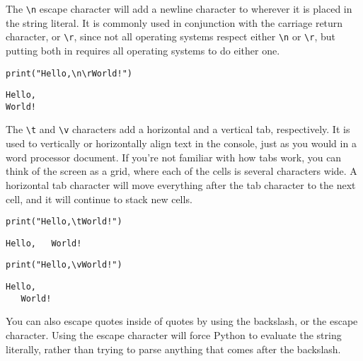 \par
{}
The \verb|\n| escape character will add a newline character to wherever it is placed in the string literal. It is commonly used in conjunction with the carriage return character, or \verb|\r|, since not all operating systems respect either \verb|\n| or \verb|\r|, but putting both in requires all operating systems to do either one.\par
\begin{lstlisting}[style=pippython]
print("Hello,\n\rWorld!")
\end{lstlisting}
\begin{lstlisting}
Hello,
World!
\end{lstlisting}
The \verb|\t| and \verb|\v| characters add a horizontal and a vertical tab, respectively. It is used to vertically or horizontally align text in the console, just as you would in a word processor document. If you're not familiar with how tabs work, you can think of the screen as a grid, where each of the cells is several characters wide. A horizontal tab character will move everything after the tab character to the next cell, and it will continue to stack new cells.\par
\begin{lstlisting}[style=pippython]
print("Hello,\tWorld!")
\end{lstlisting}
\begin{lstlisting}
Hello,   World!
\end{lstlisting}
\begin{lstlisting}[style=pippython]
print("Hello,\vWorld!")
\end{lstlisting}
\begin{lstlisting}
Hello,
   World!
\end{lstlisting}
You can also escape quotes inside of quotes by using the backslash, or the escape character. Using the escape character will force Python to evaluate the string literally, rather than trying to parse anything that comes after the backslash.\par
